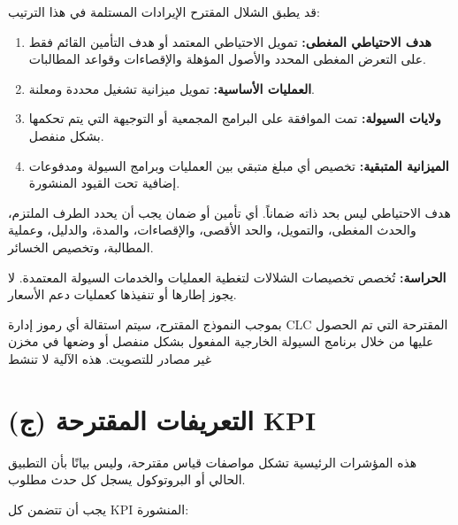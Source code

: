 \documentclass[11pt]{article}
\begin{document}
قد يطبق الشلال المقترح الإيرادات المستلمة في هذا الترتيب:

\begin{enumerate}[leftmargin=*]
\item \textbf{هدف الاحتياطي المغطى:} تمويل الاحتياطي المعتمد أو هدف التأمين القائم فقط على التعرض المغطى المحدد والأصول المؤهلة والإقصاءات وقواعد المطالبات.
\item \textbf{العمليات الأساسية:} تمويل ميزانية تشغيل محددة ومعلنة.
\item \textbf{ولايات السيولة:} تمت الموافقة على البرامج المجمعية أو التوجيهة التي يتم تحكمها بشكل منفصل.
\item \textbf{الميزانية المتبقية:} تخصيص أي مبلغ متبقي بين العمليات وبرامج السيولة ومدفوعات إضافية تحت القيود المنشورة.
\end{enumerate}
هدف الاحتياطي ليس بحد ذاته ضماناً. أي تأمين أو ضمان يجب أن يحدد الطرف الملتزم، والحدث المغطى، والتمويل، والحد الأقصى، والإقصاءات، والمدة، والدليل، وعملية المطالبة، وتخصيص الخسائر.

\textbf{الحراسة:} تُخصص تخصيصات الشلالات لتغطية العمليات والخدمات السيولة المعتمدة. لا يجوز إطارها أو تنفيذها كعمليات دعم الأسعار.

بموجب النموذج المقترح، سيتم استقالة أي رموز إدارة CLC المقترحة التي تم الحصول عليها من خلال برنامج السيولة الخارجية المفعول بشكل منفصل أو وضعها في مخزن غير مصادر للتصويت. هذه الآلية لا تنشط


\section*{(ج) التعريفات المقترحة KPI}

هذه المؤشرات الرئيسية تشكل مواصفات قياس مقترحة، وليس بيانًا بأن التطبيق الحالي أو البروتوكول يسجل كل حدث مطلوب.

يجب أن تتضمن كل KPI المنشورة:
\end{document}
